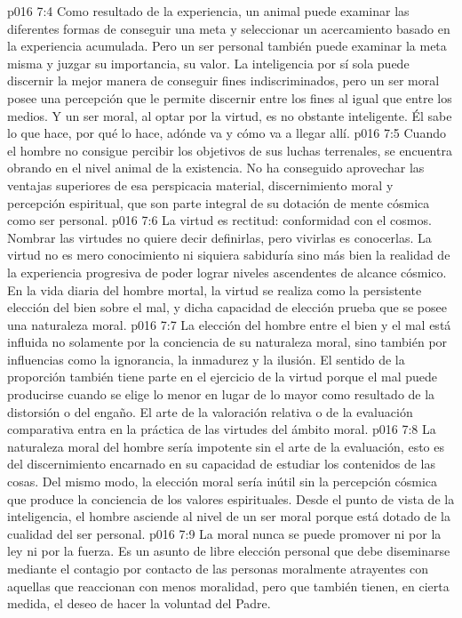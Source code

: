 \vs p016 7:4 Como resultado de la experiencia, un animal puede examinar las diferentes formas de conseguir una meta y seleccionar un acercamiento basado en la experiencia acumulada. Pero un ser personal también puede examinar la meta misma y juzgar su importancia, su valor. La inteligencia por sí sola puede discernir la mejor manera de conseguir fines indiscriminados, pero un ser moral posee una percepción que le permite discernir entre los fines al igual que entre los medios. Y un ser moral, al optar por la virtud, es no obstante inteligente. Él sabe lo que hace, por qué lo hace, adónde va y cómo va a llegar allí.
\vs p016 7:5 Cuando el hombre no consigue percibir los objetivos de sus luchas terrenales, se encuentra obrando en el nivel animal de la existencia. No ha conseguido aprovechar las ventajas superiores de esa perspicacia material, discernimiento moral y percepción espiritual, que son parte integral de su dotación de mente cósmica como ser personal.
\vs p016 7:6 \pc La virtud es rectitud: conformidad con el cosmos. Nombrar las virtudes no quiere decir definirlas, pero vivirlas es conocerlas. La virtud no es mero conocimiento ni siquiera sabiduría sino más bien la realidad de la experiencia progresiva de poder lograr niveles ascendentes de alcance cósmico. En la vida diaria del hombre mortal, la virtud se realiza como la persistente elección del bien sobre el mal, y dicha capacidad de elección prueba que se posee una naturaleza moral.
\vs p016 7:7 La elección del hombre entre el bien y el mal está influida no solamente por la conciencia de su naturaleza moral, sino también por influencias como la ignorancia, la inmadurez y la ilusión. El sentido de la proporción también tiene parte en el ejercicio de la virtud porque el mal puede producirse cuando se elige lo menor en lugar de lo mayor como resultado de la distorsión o del engaño. El arte de la valoración relativa o de la evaluación comparativa entra en la práctica de las virtudes del ámbito moral.
\vs p016 7:8 \pc La naturaleza moral del hombre sería impotente sin el arte de la evaluación, esto es del discernimiento encarnado en su capacidad de estudiar los contenidos de las cosas. Del mismo modo, la elección moral sería inútil sin la percepción cósmica que produce la conciencia de los valores espirituales. Desde el punto de vista de la inteligencia, el hombre asciende al nivel de un ser moral porque está dotado de la cualidad del ser personal.
\vs p016 7:9 \pc La moral nunca se puede promover ni por la ley ni por la fuerza. Es un asunto de libre elección personal que debe diseminarse mediante el contagio por contacto de las personas moralmente atrayentes con aquellas que reaccionan con menos moralidad, pero que también tienen, en cierta medida, el deseo de hacer la voluntad del Padre.
